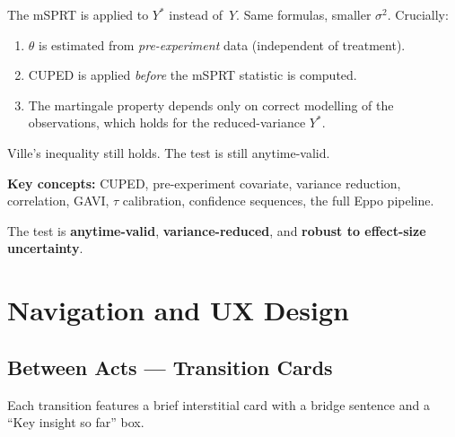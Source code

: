 \documentclass[12pt, a4paper]{article}
\begin{document}
The mSPRT is applied to $Y^*$ instead of~$Y$.  Same formulas, smaller
$\sigma^2$.  Crucially:
\begin{enumerate}[nosep]
  \item $\theta$ is estimated from \emph{pre-experiment} data (independent
        of treatment).
  \item CUPED is applied \emph{before} the mSPRT statistic is computed.
  \item The martingale property depends only on correct modelling of the
        observations, which holds for the reduced-variance $Y^*$.
\end{enumerate}
Ville's inequality still holds.  The test is still anytime-valid.

\begin{keytakeaway}
\textbf{Key concepts:} CUPED, pre-experiment covariate, variance reduction,
correlation, GAVI, $\tau$ calibration, confidence sequences, the full Eppo
pipeline.

The test is \textbf{anytime-valid}, \textbf{variance-reduced}, and
\textbf{robust to effect-size uncertainty}.
\end{keytakeaway}


\newpage
\section{Navigation and UX Design}

\subsection{Between Acts --- Transition Cards}

Each transition features a brief interstitial card with a bridge sentence and
a ``Key insight so far'' box.
\end{document}
